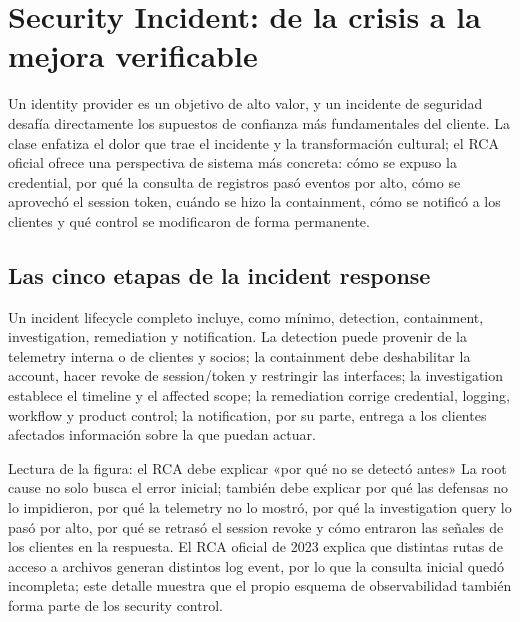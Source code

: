 \section{Security Incident: de la crisis a la mejora verificable}

Un identity provider es un objetivo de alto valor, y un incidente de seguridad desafía directamente los supuestos de confianza más fundamentales del cliente. La clase enfatiza el dolor que trae el incidente y la transformación cultural; el RCA oficial ofrece una perspectiva de sistema más concreta: cómo se expuso la credential, por qué la consulta de registros pasó eventos por alto, cómo se aprovechó el session token, cuándo se hizo la containment, cómo se notificó a los clientes y qué control se modificaron de forma permanente.

\subsection{Las cinco etapas de la incident response}

Un incident lifecycle completo incluye, como mínimo, detection, containment, investigation, remediation y notification. La detection puede provenir de la telemetry interna o de clientes y socios; la containment debe deshabilitar la account, hacer revoke de session/token y restringir las interfaces; la investigation establece el timeline y el affected scope; la remediation corrige credential, logging, workflow y product control; la notification, por su parte, entrega a los clientes afectados información sobre la que puedan actuar.


\begin{knowledgebox}{Lectura de la figura: el RCA debe explicar «por qué no se detectó antes»}
La root cause no solo busca el error inicial; también debe explicar por qué las defensas no lo impidieron, por qué la telemetry no lo mostró, por qué la investigation query lo pasó por alto, por qué se retrasó el session revoke y cómo entraron las señales de los clientes en la respuesta. El RCA oficial de 2023 explica que distintas rutas de acceso a archivos generan distintos log event, por lo que la consulta inicial quedó incompleta; este detalle muestra que el propio esquema de observabilidad también forma parte de los security control.
\end{knowledgebox}

